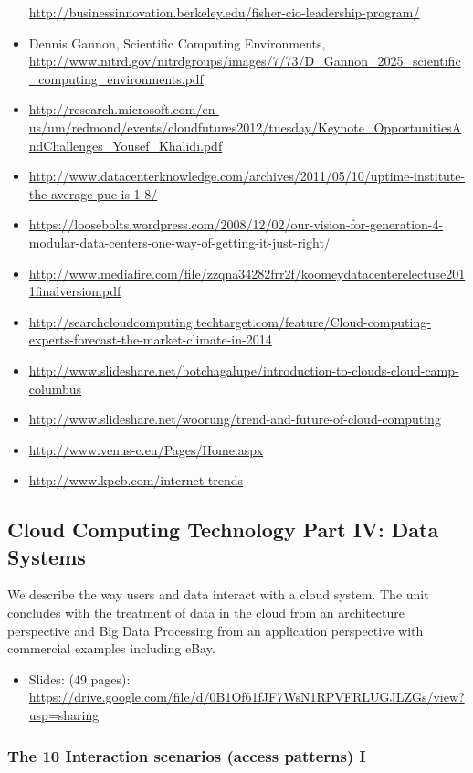 \begin{itemize}
  \url{http://businessinnovation.berkeley.edu/fisher-cio-leadership-program/}
\item
  Dennis Gannon, Scientific Computing Environments,
  \url{http://www.nitrd.gov/nitrdgroups/images/7/73/D_Gannon_2025_scientific_computing_environments.pdf}
\item
  \url{http://research.microsoft.com/en-us/um/redmond/events/cloudfutures2012/tuesday/Keynote_OpportunitiesAndChallenges_Yousef_Khalidi.pdf}
\item
  \url{http://www.datacenterknowledge.com/archives/2011/05/10/uptime-institute-the-average-pue-is-1-8/}
\item
  \url{https://loosebolts.wordpress.com/2008/12/02/our-vision-for-generation-4-modular-data-centers-one-way-of-getting-it-just-right/}
\item
  \url{http://www.mediafire.com/file/zzqna34282frr2f/koomeydatacenterelectuse2011finalversion.pdf}
\item
  \url{http://searchcloudcomputing.techtarget.com/feature/Cloud-computing-experts-forecast-the-market-climate-in-2014}
\item
  \url{http://www.slideshare.net/botchagalupe/introduction-to-clouds-cloud-camp-columbus}
\item
  \url{http://www.slideshare.net/woorung/trend-and-future-of-cloud-computing}
\item
  \url{http://www.venus-c.eu/Pages/Home.aspx}
\item
  \url{http://www.kpcb.com/internet-trends}
\end{itemize}

\subsection{Cloud Computing Technology Part IV: Data
Systems}\label{cloud-computing-technology-part-iv-data-systems}

We describe the way users and data interact with a cloud system. The
unit concludes with the treatment of data in the cloud from an
architecture perspective and Big Data Processing from an application
perspective with commercial examples including eBay.

\begin{itemize}
\tightlist
\item
  Slides: (49 pages):
  \url{https://drive.google.com/file/d/0B1Of61fJF7WsN1RPVFRLUGJLZGs/view?usp=sharing}
\end{itemize}

\subsubsection{The 10 Interaction scenarios (access patterns)
I}\label{the-10-interaction-scenarios-access-patterns-i}

